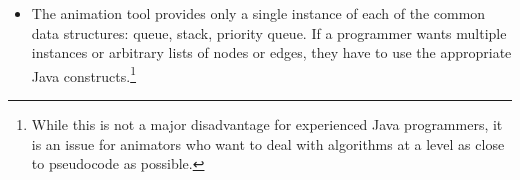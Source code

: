 \begin{itemize}
\item
The animation tool provides only a single instance of each of the common data structures: queue, stack, priority queue. If a programmer wants multiple instances
or arbitrary lists of nodes or edges, they have to use the appropriate Java constructs.\footnote{
  While this is not a major disadvantage for experienced Java programmers, it is
  an issue for animators who want to deal with algorithms at a level as
  close to pseudocode as possible.
}

\end{itemize}

